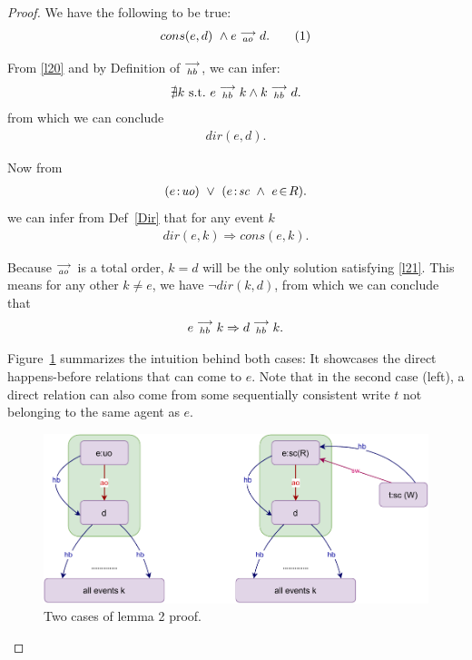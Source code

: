 \begin{proof}
    
    We have the following to be true: 
    \begin{align*}
        cons(e,d) \ \wedge e\stackrel{\longrightarrow}{_{ao}}d.
        \tag{1}
        \label{l20}   
    \end{align*}

    From \ref{l20} and by Definition of $\stackrel{\longrightarrow}{_{hb}}$, we can infer:
    \begin{align*}
        \nexists k \ \text{s.t.} \ e\stackrel{\longrightarrow}{_{hb}}k \wedge k\stackrel{\longrightarrow}{_{hb}}d.
    \end{align*}
    from which we can conclude 
    \begin{align*}
        dir(e,d).
    \end{align*}

    Now from 
    \begin{align*}
        (e\!:\!\textit{uo}) \ \vee \
        (e\!:\!\textit{sc} \ \wedge \ e\!\in\!R). 
    \end{align*}
    we can infer from Def~\ref{Dir} that for any event $k$
    \begin{align*}
        dir(e,k) \Rightarrow cons(e,k).
        \tag{2}
        \label{l21}
    \end{align*}
        
    Because $\stackrel{\longrightarrow}{_{ao}}$ is a total order, $k=d$ will be the only solution satisfying \ref{l21}.  
    This means for any other $k \neq e$, we have $\neg dir(k,d)$, from which we can conclude that     
    \begin{align*}
        e\stackrel{\longrightarrow}{_{hb}}k \Rightarrow d\stackrel{\longrightarrow}{_{hb}}k.
    \end{align*}
     
    Figure~\ref{lemma:second} summarizes the intuition behind both cases: 
    It showcases the direct happens-before relations that can come to $e$.  
    Note that in the second case (left), a direct relation can also come from some sequentially consistent write $t$ not belonging to the same agent as $e$.
    \begin{figure}[H]
        \centering
        \includegraphics[scale=0.7]{4.InstructionReordering/3.Lemmas/Lemma2.pdf}
        \caption{Two cases of lemma 2 proof.}
        \label{lemma:second}
    \end{figure}

\end{proof}

